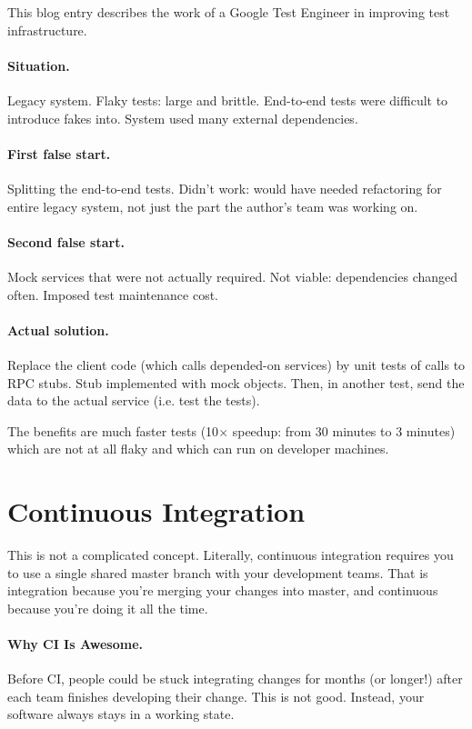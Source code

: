\documentclass[11pt]{article}
\begin{document}
This blog entry describes the work of a Google Test Engineer in improving test infrastructure.

\paragraph{Situation.} Legacy system. Flaky tests: large and brittle. End-to-end tests
were difficult to introduce fakes into. System used many external dependencies.

\paragraph{First false start.} Splitting the end-to-end tests. Didn't work: would have needed
refactoring for entire legacy system, not just the part the author's team was working on.

\paragraph{Second false start.} Mock services that were not actually required. Not viable: 
dependencies changed often. Imposed test maintenance cost.

\paragraph{Actual solution.} Replace the client code (which calls depended-on services)
by unit tests of calls to RPC stubs. Stub implemented with mock objects.
Then, in another test, send the data to the actual service (i.e. test the tests).

The benefits are much faster tests (10$\times$ speedup: from 30 minutes to 3 minutes)
which are not at all flaky and which can run on developer machines.


\section*{Continuous Integration}
This is not a complicated concept. Literally, continuous integration requires you to use
a single shared master branch with your development teams. That is integration because you're
merging your changes into master, and continuous because you're doing it all the time.

\paragraph{Why CI Is Awesome.} Before CI, people could be stuck integrating changes for months 
(or longer!) after each team finishes developing their change. This is not good. Instead,
your software always stays in a working state.
\end{document}
